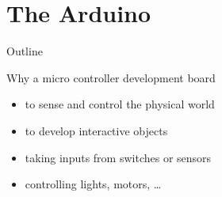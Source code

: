 \section {The Arduino}
\begin{frame} {Outline}
    \tableofcontents [current]
\end{frame}

\begin{frame} {Why a micro controller development board}
    \begin{itemize}
		\item to sense and control the physical world
		\item to develop interactive objects
		\item taking inputs from switches or sensors
		\item controlling lights, motors, …
    \end{itemize}
\end{frame}



